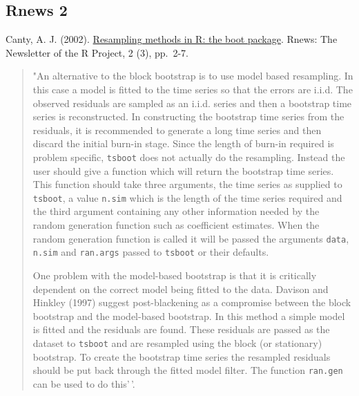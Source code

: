 \documentclass[
]{book}
\theoremstyle{break}
\theoremstyle{definition}
\theoremstyle{definition}
\theoremstyle{definition}
\theoremstyle{definition}
\theoremstyle{remark}
\begin{document}
\hypertarget{rnews-2}{%
\subsection{Rnews 2}\label{rnews-2}}

Canty, A. J. (2002). \href{http://cran.fhcrc.org/doc/Rnews/Rnews_2002-3.pdf}{Resampling methods in R: the boot package}. Rnews: The Newsletter of the R Project, 2 (3), pp.~2-7.

\begin{quote}
"An alternative to the block bootstrap is to use
model based resampling. In this case a model is fitted
to the time series so that the errors are i.i.d. The
observed residuals are sampled as an i.i.d. series and
then a bootstrap time series is reconstructed. In constructing
the bootstrap time series from the residuals,
it is recommended to generate a long time series
and then discard the initial burn-in stage. Since
the length of burn-in required is problem specific,
\texttt{tsboot} does not actually do the resampling. Instead
the user should give a function which will return the
bootstrap time series. This function should take three
arguments, the time series as supplied to \texttt{tsboot}, a
value \texttt{n.sim} which is the length of the time series required
and the third argument containing any other
information needed by the random generation function
such as coefficient estimates. When the random
generation function is called it will be passed the arguments
\texttt{data}, \texttt{n.sim} and \texttt{ran.args} passed to \texttt{tsboot}
or their defaults.

One problem with the model-based bootstrap is
that it is critically dependent on the correct model
being fitted to the data. Davison and Hinkley (1997)
suggest post-blackening as a compromise between the
block bootstrap and the model-based bootstrap. In
this method a simple model is fitted and the residuals
are found. These residuals are passed as the dataset
to \texttt{tsboot} and are resampled using the block (or stationary)
bootstrap. To create the bootstrap time series
the resampled residuals should be put back through
the fitted model filter. The function \texttt{ran.gen} can be
used to do this'\,'.
\end{quote}
\end{document}
